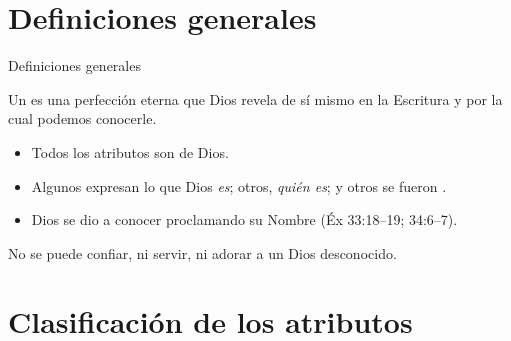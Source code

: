 \section[Definiciones generales]{Definiciones generales}
\begin{frame}{Definiciones generales}
\begin{tcolorbox}[colback=azulcl,colframe=azulp,boxrule=1pt,arc=3pt,fontupper=\small]
Un  es una perfección eterna que Dios revela de sí mismo en la Escritura y por la cual podemos conocerle.
\end{tcolorbox}
\begin{itemize}\small
\item Todos los atributos son  de Dios.
\item Algunos expresan lo que Dios \emph{es}; otros, \emph{quién es}; y otros se fueron .
\item Dios se dio a conocer proclamando su Nombre (Éx 33:18–19; 34:6–7).
\end{itemize}
\begin{cita}No se puede confiar, ni servir, ni adorar a un Dios desconocido.\end{cita}
\end{frame}

\section[Clasificación]{Clasificación de los atributos}
\newcommand{\clasif}[8]{%
\begin{frame}{#2}
\fotolado{#1}{}
\begin{columns}[t,onlytextwidth]
\begin{column}{0.57\textwidth}
\scriptsize
{\bfseries\color{celeste}PALABRA CLAVE: #3}\par\vspace{5pt}
\textbf{Definición breve:} #4\par\vspace{4pt}
\textbf{Rasgos centrales:} #5\par\vspace{4pt}
\textbf{Ejemplos:} #6\par\vspace{4pt}
\textbf{#7}\par\vspace{4pt}
{\color{grisaz}\textbf{Referencias bíblicas:} #8}
\end{column}
\begin{column}{0.41\textwidth}\end{column}
\end{columns}
\end{frame}}

